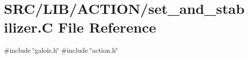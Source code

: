\hypertarget{set__and__stabilizer_8_c}{}\section{S\+R\+C/\+L\+I\+B/\+A\+C\+T\+I\+O\+N/set\+\_\+and\+\_\+stabilizer.C File Reference}
\label{set__and__stabilizer_8_c}
{\ttfamily \#include \char`\"{}galois.\+h\char`\"{}}\newline
{\ttfamily \#include \char`\"{}action.\+h\char`\"{}}\newline
